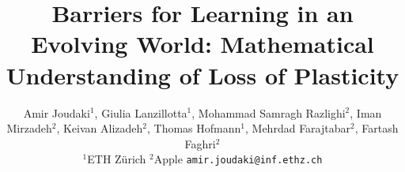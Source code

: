 \documentclass[25pt, a0paper, landscape]{tikzposter}
\begin{document}
\title{\textbf{Barriers for Learning in an Evolving World: Mathematical Understanding of Loss of Plasticity}}

\author{{\Large%
Amir Joudaki$^{1}$,\;
Giulia Lanzillotta$^{1}$,\;
Mohammad Samragh Razlighi$^{2}$,\;
Iman Mirzadeh$^{2}$,\;
Keivan Alizadeh$^{2}$,\;
Thomas Hofmann$^{1}$,\;
Mehrdad Farajtabar$^{2}$,\;
Fartash Faghri$^{2}$%
}\\[4pt]
{\large $^{1}$ETH Z\"urich \quad $^{2}$Apple \quad
\texttt{amir.joudaki@inf.ethz.ch}}%
}

\institute{}

\maketitle

\end{document}
